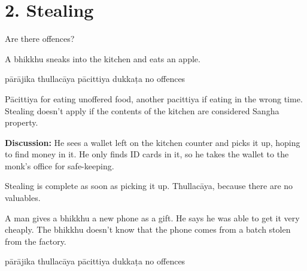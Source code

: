 \chapter{2. Stealing}
\renewcommand*{\theChapterTitle}{2. Stealing}

\begin{exam}{\autoExamName}

\begin{problem*}

  Are there offences?

\begin{parts}

  \item A bhikkhu sneaks into the kitchen and eats an apple.

  \bigskip

  \begin{answers}{5}
    \bChoices
     pārājika\eAns
     thullacāya\eAns
     pācittiya\eAns
     dukkaṭa\eAns
     no offences\eAns
    \eChoices
  \end{answers}

  \bigskip

  \begin{solution}
    Pācittiya for eating unoffered food, another pacittiya if eating in the
    wrong time. Stealing doesn't apply if the contents of the kitchen are
    considered Sangha property.
  \end{solution}

  \textbf{Discussion:} He sees a wallet left on the kitchen counter and picks it
  up, hoping to find money in it. He only finds ID cards in it, so he takes the
  wallet to the monk's office for safe-keeping.

  \begin{solution}
    Stealing is complete as soon as picking it up. Thullacāya, because there are
    no valuables.
  \end{solution}

  \bigskip

  \item A man gives a bhikkhu a new phone as a gift. He says he was able to get it very cheaply.
  The bhikkhu doesn't know that the phone comes from a batch stolen from the factory. 

  \bigskip

  \begin{answers}{5}
    \bChoices
     pārājika\eAns
     thullacāya\eAns
     pācittiya\eAns
     dukkaṭa\eAns
     no offences\eAns
    \eChoices
  \end{answers}


\end{parts}
\end{problem*}
\end{exam}
